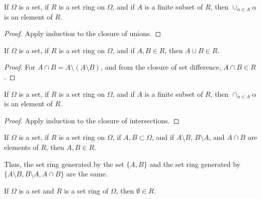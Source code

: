                 \begin{theorem}
                    If $\Omega$ is a set, if $R$ is a set ring
                    on $\Omega$, and if $A$ is a finite subset of
                    $R$, then $\cup_{\alpha\in{A}}\alpha$ is an
                    element of $R$.
                \end{theorem}
                \begin{proof}
                    Apply induction to the closure of unions.
                \end{proof}
                \begin{theorem}
                    If $\Omega$ is a set, if $R$ is a set ring on
                    $\Omega$, and if $A,B\in{R}$, then
                    $A\cup{B}\in{R}$.
                \end{theorem}
                \begin{proof}
                    For $A\cap{B}=A\setminus(A\setminus{B})$, and
                    from the closure of set difference,
                    $A\cap{B}\in{R}$.
                \end{proof}
                \begin{theorem}
                    If $\Omega$ is a set, if $R$ is a set ring
                    on $\Omega$, and if $A$ is a finite subset of
                    $R$, then $\cap_{\alpha\in{A}}\alpha$ is an
                    element of $R$.
                \end{theorem}
                \begin{proof}
                    Apply induction to the closure of intersections.
                \end{proof}
                \begin{theorem}
                    If $\Omega$ is a set, if $R$ is a set ring on
                    $\Omega$, if $A,B\subset\Omega$, and if
                    $A\setminus{B}$, $B\setminus{A}$, and
                    $A\cap{B}$ are elements of $R$, then
                    $A,B\in{R}$.
                \end{theorem}
                Thus, the set ring generated by the set $\{A,B\}$ and
                the set ring generated by
                $\{A\setminus{B},B\setminus{A},A\cap{B}\}$ are the
                same.
                \begin{theorem}
                    If $\Omega$ is a set and $R$ is a set ring
                    of $\Omega$, then $\emptyset\in{R}$.
                \end{theorem}
